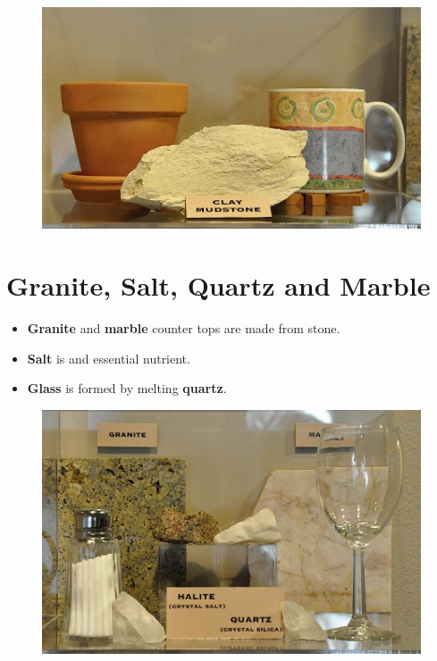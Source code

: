 \documentclass[12pt, letterpaper]{article}
\begin{document}
	\begin{figure}[h]
		\includegraphics{shelf02_0}
		\centering
	\end{figure}

\section{Granite, Salt, Quartz and Marble}

	\begin{itemize}
		\item \textbf{Granite} and \textbf{marble} counter tops are made from stone.
		\item \textbf{Salt} is and essential nutrient.
		\item \textbf{Glass} is formed by melting \textbf{quartz}.
	\end{itemize}
	
	\begin{figure}[h]
		\includegraphics{shelf03}
		\centering
	\end{figure}
\end{document}

